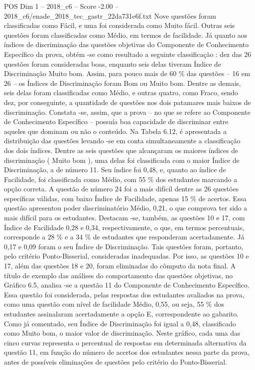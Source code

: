 \begin{textsample}{POS Dim 1 – 2018\_c6 – Score -2.00 – 2018\_c6/enade\_2018\_tec\_gastr\_22da731e6f.txt}
Nove questões foram classificadas como Fácil, e uma foi considerada como Muito fácil.
Outras seis questões foram classificadas como Médio, em termos de facilidade.
Já quanto aos índices de discriminação das questões objetivas do Componente de Conhecimento Específico da prova, obtém -se como resultado a seguinte classificação : dez das 26 questões foram consideradas boas, enquanto seis delas tiveram Índice de Discriminação Muito bom.
Assim, para pouco mais de 60 \% das questões – 16 em 26 – os Índices de Discriminação foram Bom ou Muito bom.
Dentre as demais, seis delas foram classificadas como Médio, e outras quatro, como Fraco, sendo dez, por conseguinte, a quantidade de questões nos dois patamares mais baixos de discriminação.
Constata -se, assim, que a prova – no que se refere ao Componente de Conhecimento Específico – possuía boa capacidade de discriminar entre aqueles que dominam ou não o conteúdo.
Na Tabela 6.12, é apresentada a distribuição das questões levando -se em conta simultaneamente a classificação dos dois índices.
Dentre as seis questões que alcançaram os maiores índices de discriminação ( Muito bom ), uma delas foi classificada com o maior Índice de Discriminação, a de número 11.
Seu índice foi 0,48, e, quanto ao índice de Facilidade, foi classificada como Médio, com 55 \% dos estudantes marcando a opção correta.
A questão de número 24 foi a mais difícil dentre as 26 questões específicas válidas, com baixo Índice de Facilidade, apenas 15 \% de acertos.
Essa questão apresentou poder discriminatório Médio, 0,21, o que comprova ter sido a mais difícil para os estudantes.
Destacam -se, também, as questões 10 e 17, com Índice de Facilidade 0,28 e 0,34, respectivamente, o que, em termos percentuais, corresponde a 28 \% e a 34 \% de estudantes que responderam acertadamente.
Já 0,17 e 0,09 foram o seu Índice de Discriminação.
Tais questões foram, portanto, pelo critério Ponto-Bisserial, consideradas inadequadas.
Por isso, as questões 10 e 17, além das questões 18 e 20, foram eliminadas do cômputo da nota final.
A título de exemplo das análises do comportamento das questões objetivas, no Gráfico 6.5, analisa -se a questão 11 do Componente de Conhecimento Específico.
Essa questão foi considerada, pelas respostas dos estudantes avaliados na prova, como uma questão com nível de facilidade Médio, 0,55, ou seja, 55 \% dos estudantes assinalaram acertadamente a opção E, correspondente ao gabarito.
Como já comentado, seu Índice de Discriminação foi igual a 0,48, classificado como Muito bom, o maior valor de discriminação.
Neste gráfico, cada uma das cinco curvas representa o percentual de respostas em determinada alternativa da questão 11, em função do número de acertos dos estudantes nessa parte da prova, antes de possíveis eliminações de questões pelo critério do Ponto-Bisserial.

\end{textsample}
